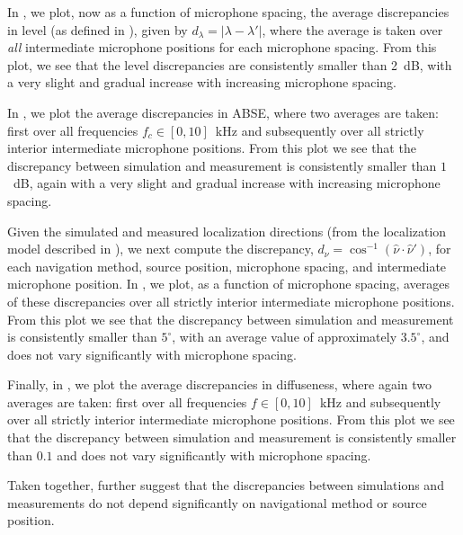 In , we plot, now as a function of microphone spacing, the average discrepancies in level (as defined in ), given by $d_\lambda = |\lambda - \lambda'|$, where the average is taken over \textit{all} intermediate microphone positions for each microphone spacing.
From this plot, we see that the level discrepancies are consistently smaller than 2~dB, with a very slight and gradual increase with increasing microphone spacing.

In , we plot the average discrepancies in ABSE, where two averages are taken: first over all frequencies $f_c \in [0,10]$~kHz and subsequently over all strictly interior intermediate microphone positions.
From this plot we see that the discrepancy between simulation and measurement is consistently smaller than $1$~dB, again with a very slight and gradual increase with increasing microphone spacing.

Given the simulated and measured localization directions (from the localization model described in ), we next compute the discrepancy, $d_\nu = \cos^{-1} \left( \hat{\nu} \cdot \hat{\nu}' \right)$, for each navigation method, source position, microphone spacing, and intermediate microphone position.
In , we plot, as a function of microphone spacing, averages of these discrepancies over all strictly interior intermediate microphone positions.
From this plot we see that the discrepancy between simulation and measurement is consistently smaller than $5^\circ$, with an average value of approximately $3.5^\circ$, and does not vary significantly with microphone spacing.

Finally, in , we plot the average discrepancies in diffuseness, where again two averages are taken: first over all frequencies $f \in [0,10]$~kHz and subsequently over all strictly interior intermediate microphone positions.
From this plot we see that the discrepancy between simulation and measurement is consistently smaller than $0.1$ and does not vary significantly with microphone spacing.

Taken together,  further suggest that the discrepancies between simulations and measurements do not depend significantly on navigational method or source position.